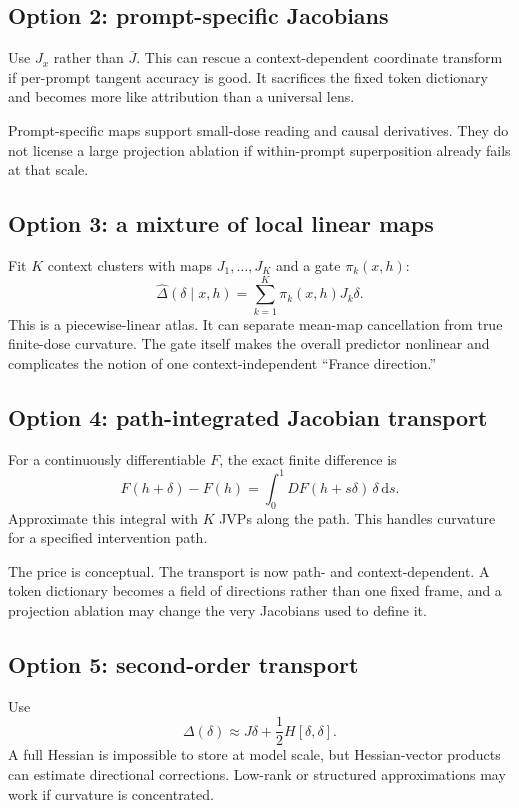 \documentclass[11pt]{article}
\newcommand{\Jbar}{\overline{J}}
\newcommand{\dd}{\,\mathrm{d}}
\theoremstyle{definition}
\theoremstyle{remark}
\begin{document}
\subsection{Option 2: prompt-specific Jacobians}
Use $J_x$ rather than $\Jbar$. This can rescue a context-dependent coordinate transform if per-prompt tangent accuracy is good. It sacrifices the fixed token dictionary and becomes more like attribution than a universal lens.

Prompt-specific maps support small-dose reading and causal derivatives. They do not license a large projection ablation if within-prompt superposition already fails at that scale.

\subsection{Option 3: a mixture of local linear maps}
Fit $K$ context clusters with maps $J_1,\ldots,J_K$ and a gate $\pi_k(x,h)$:
\begin{equation}
  \widehat{\Delta}(\delta\mid x,h)
  =\sum_{k=1}^K \pi_k(x,h)J_k\delta.
  \label{eq:mixtureJ}
\end{equation}
This is a piecewise-linear atlas. It can separate mean-map cancellation from true finite-dose curvature. The gate itself makes the overall predictor nonlinear and complicates the notion of one context-independent ``France direction.''

\subsection{Option 4: path-integrated Jacobian transport}
For a continuously differentiable $F$, the exact finite difference is
\begin{equation}
  F(h+\delta)-F(h)
  =\int_0^1 DF(h+s\delta)\,\delta\dd s.
  \label{eq:path_integral}
\end{equation}
Approximate this integral with $K$ JVPs along the path. This handles curvature for a specified intervention path.

The price is conceptual. The transport is now path- and context-dependent. A token dictionary becomes a field of directions rather than one fixed frame, and a projection ablation may change the very Jacobians used to define it.

\subsection{Option 5: second-order transport}
Use
\begin{equation}
  \Delta(\delta)
  \approx J\delta+\frac{1}{2}H[\delta,\delta].
  \label{eq:quadratic_transport}
\end{equation}
A full Hessian is impossible to store at model scale, but Hessian-vector products can estimate directional corrections. Low-rank or structured approximations may work if curvature is concentrated.
\end{document}
